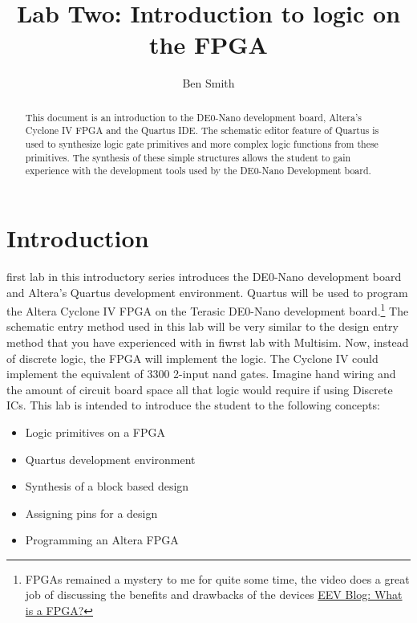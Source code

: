 \title{Lab Two: Introduction to logic on the FPGA}
\author{Ben Smith}



\maketitle

  \begin{abstract}
    This document is an introduction to the DE0-Nano development board, Altera's Cyclone IV FPGA and the Quartus IDE. The schematic editor feature of Quartus is used to synthesize logic gate primitives and more complex logic functions from these primitives. The synthesis of these simple structures allows the student to gain experience with the development tools used by the DE0-Nano Development board.
  \end{abstract}

  \section{Introduction}
     first lab in this introductory series introduces the DE0-Nano development board and Altera's Quartus development environment. Quartus will be used to program the Altera Cyclone IV FPGA on the Terasic DE0-Nano development board.\footnote{FPGAs remained a mystery to me for quite some time, the video does a great job of discussing the benefits and drawbacks of the devices \href{https://www.youtube.com/watch?v=gUsHwi4M4xE}{EEV Blog: What is a FPGA?}}  The schematic entry method used in this lab will be very similar to the design entry method that you have experienced with in fiwrst lab with Multisim. Now, instead of discrete logic, the FPGA will implement the logic. The Cyclone IV could implement the equivalent of 3300 2-input nand gates. Imagine hand wiring and the amount of circuit board space all that logic would require if using Discrete ICs. This lab is intended to introduce the student to the following concepts:
    \begin{itemize}
       \item Logic primitives on a FPGA
       \item Quartus development environment
       \item Synthesis of a block based design
       \item Assigning pins for a design
       \item Programming an Altera FPGA
    \end{itemize}

